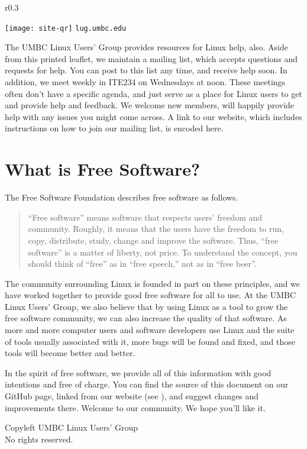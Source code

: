 \documentclass[11pt,notumble]{leaflet}
\begin{document}
\begin{wrapfigure}{r}{0.3\textwidth}
    \vspace{-3em}
    \begin{center}
        \texttt{[image: site-qr]}
        \vspace{-2em}
        \texttt{lug.umbc.edu}
    \end{center}
\end{wrapfigure}

The UMBC Linux Users' Group provides resources for Linux help, also. Aside from
this printed leaflet, we maintain a mailing list, which accepts questions and
requests for help. You can post to this list any time, and receive help soon. In
addition, we meet weekly in ITE234 on Wednesdays at noon. These meetings often
don't have a specific agenda, and just serve as a place for Linux users to get
and provide help and feedback. We welcome new members, will happily provide help
with any issues you might come across. A link to our website, which includes
instructions on how to join our mailing list, is encoded here.

\section{What is Free Software?}
\label{section:free-software}

The Free Software Foundation describes free software as follows.

\begin{quote}
    “Free software” means software that respects users' freedom and community.
    Roughly, it means that the users have the freedom to run, copy, distribute,
    study, change and improve the software. Thus, “free software” is a matter of
    liberty, not price. To understand the concept, you should think of “free” as
    in “free speech,” not as in “free beer”.
\end{quote}

The community surrounding Linux is founded in part on these principles, and we
have worked together to provide good free software for all to use. At the UMBC
Linux Users' Group, we also believe that by using Linux as a tool to grow the
free software community, we can also increase the quality of that software. As
more and more computer users and software developers use Linux and the suite of
tools usually associated with it, more bugs will be found and fixed, and those
tools will become better and better.

In the spirit of free software, we provide all of this information with good
intentions and free of charge. You can find the source of this document on our
GitHub page, linked from our website (see ), and
suggest changes and improvements there. Welcome to our community. We hope you'll
like it.

\vfill
\begin{center} \small 
    \textcopyleft{} Copyleft \the\year{} UMBC Linux Users' Group \\
    No rights reserved.
\end{center}
\end{document}
